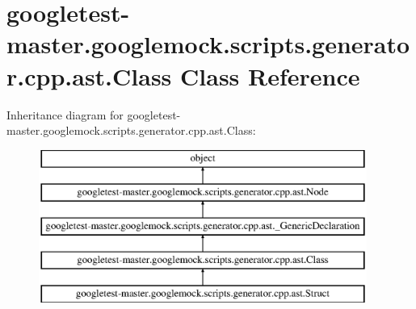 \hypertarget{classgoogletest-master_1_1googlemock_1_1scripts_1_1generator_1_1cpp_1_1ast_1_1_class}{}\section{googletest-\/master.googlemock.\+scripts.\+generator.\+cpp.\+ast.\+Class Class Reference}
\label{classgoogletest-master_1_1googlemock_1_1scripts_1_1generator_1_1cpp_1_1ast_1_1_class}
Inheritance diagram for googletest-\/master.googlemock.\+scripts.\+generator.\+cpp.\+ast.\+Class\+:\begin{figure}[H]
\begin{center}
\leavevmode
\includegraphics[height=5.000000cm]{d5/d5c/classgoogletest-master_1_1googlemock_1_1scripts_1_1generator_1_1cpp_1_1ast_1_1_class}
\end{center}
\end{figure}
